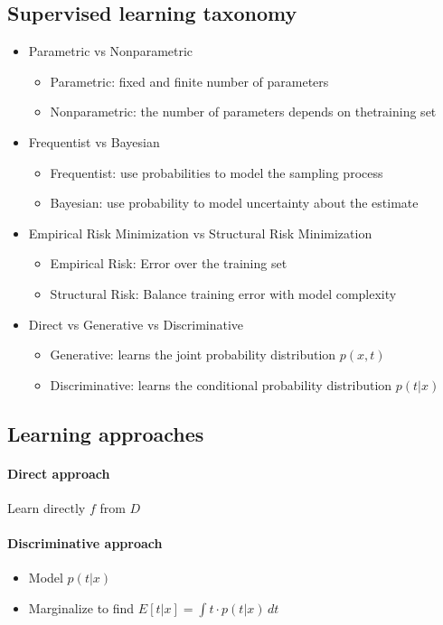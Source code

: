 \documentclass{article}
\begin{document}
\subsection{Supervised learning taxonomy}
\begin{itemize}
\item Parametric vs Nonparametric
\begin{itemize}
	\item Parametric: fixed and finite number of parameters
	\item Nonparametric: the number of parameters depends on thetraining set
\end{itemize}
\item Frequentist vs Bayesian
\begin{itemize}
	\item Frequentist: use probabilities to model the sampling process 
	\item Bayesian: use probability to model uncertainty about the estimate
\end{itemize}
\item Empirical Risk Minimization vs Structural Risk Minimization
\begin{itemize}
	\item Empirical Risk: Error over the training set
	\item Structural Risk: Balance training error with model complexity
\end{itemize}
\item Direct vs Generative vs Discriminative 
\begin{itemize}
	\item Generative: learns the joint probability distribution $p(x,t)$
	\item Discriminative: learns the conditional probability distribution $p(t|x)$
\end{itemize}
\end{itemize}

\subsection{Learning approaches}

\paragraph{Direct approach} Learn directly $f$ from $D$

\paragraph{Discriminative approach}
\begin{itemize}
\item Model $p(t|x)$
\item Marginalize to find ${E[t|x]=\int t\cdot p(t|x)\, dt}$
\end{itemize}
\end{document}
